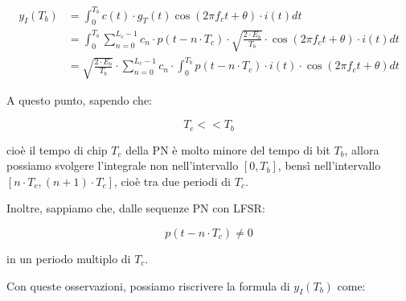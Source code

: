 {
    \Large 
    \begin{equation}
        \begin{split}
            y_I (T_b)
            &=
            \int_{0}^{T_b}
            c(t) 
            \cdot
            g_T (t)
            \cos(2 \pi f_c t + \theta)
            \cdot 
            i(t)
            dt
            \\
            &=
            \int_{0}^{T_b}
            \sum_{n = 0}^{L_c - 1}
            c_n
            \cdot
            p(t - n \cdot T_c)
            \cdot
            \sqrt{\frac{2 \cdot E_b}{T_b}}
            \cdot 
            \cos(2 \pi f_c t + \theta)
            \cdot 
            i(t)
            dt
            \\
            &=  
            \sqrt{\frac{2 \cdot E_b}{T_b}}
            \cdot
            \sum_{n = 0}^{L_c - 1}
            c_n
            \cdot 
            \int_{0}^{T_b}
            p(t - n \cdot T_c)
            \cdot 
            i(t)
            \cdot 
            \cos(2 \pi f_c t + \theta)
            dt
        \end{split}
    \end{equation}
}

A questo punto, sapendo che: 

{
    \Large 
    \begin{equation}
        T_c << T_b
    \end{equation}
}

cioè il tempo di chip $T_c$ della PN è molto minore del tempo di bit $T_b$, 
allora possiamo svolgere l'integrale non nell'intervallo $[0, T_b]$, 
bensì nell'intervallo $[n \cdot T_c, (n+1) \cdot T_c]$, cioè tra due periodi di $T_c$. \newline 

Inoltre, sappiamo che, dalle sequenze PN con LFSR: 

{
    \Large 
    \begin{equation}
        p(t - n \cdot T_c) \neq 0
    \end{equation}
}

in un periodo multiplo di $T_c$. \newline 

Con queste osservazioni, 
possiamo riscrivere la formula di $y_I (T_b)$ come: 



